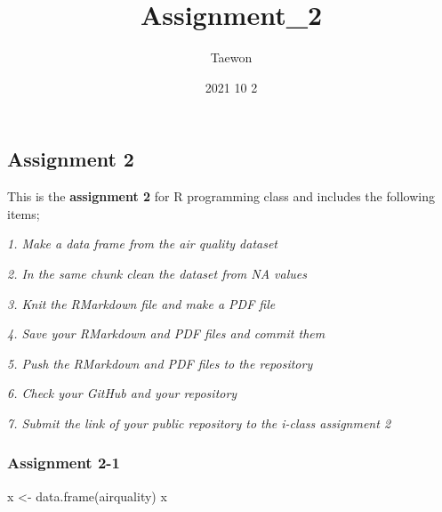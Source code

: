 \documentclass[
]{article}
\title{Assignment\_2}
\author{Taewon}
\date{2021 10 2}
\newenvironment{Shaded}{\begin{snugshade}}{\end{snugshade}}
\newcommand{\FunctionTok}[1]{\textcolor[rgb]{0.00,0.00,0.00}{#1}}
\newcommand{\NormalTok}[1]{#1}
\newcommand{\OtherTok}[1]{\textcolor[rgb]{0.56,0.35,0.01}{#1}}
\begin{document}
\maketitle

\hypertarget{assignment-2}{%
\subsection{Assignment 2}\label{assignment-2}}

This is the \textbf{assignment 2} for R programming class and includes
the following items;

\emph{1. Make a data frame from the air quality dataset}

\emph{2. In the same chunk clean the dataset from NA values}

\emph{3. Knit the RMarkdown file and make a PDF file}

\emph{4. Save your RMarkdown and PDF files and commit them}

\emph{5. Push the RMarkdown and PDF files to the repository}

\emph{6. Check your GitHub and your repository}

\emph{7. Submit the link of your public repository to the i-class
assignment 2}

\hypertarget{assignment-2-1}{%
\subsubsection{Assignment 2-1}\label{assignment-2-1}}

\begin{Shaded}
\begin{Highlighting}[]
\NormalTok{x }\OtherTok{\textless{}{-}} \FunctionTok{data.frame}\NormalTok{(airquality)}
\NormalTok{x}
\end{Highlighting}
\end{Shaded}
\end{document}
